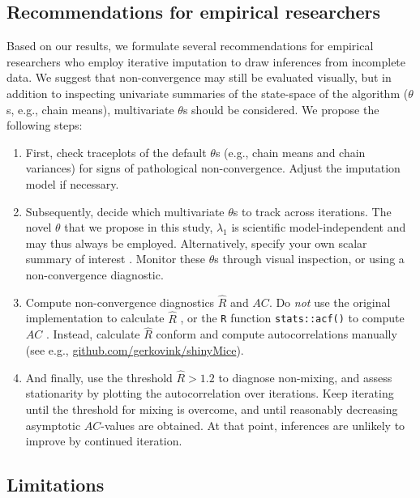 \documentclass[Royal,times,sageh]{sagej}
\begin{document}
\hypertarget{recommendations-for-empirical-researchers}{%
\subsection{Recommendations for empirical researchers}\label{recommendations-for-empirical-researchers}}

Based on our results, we formulate several recommendations for empirical researchers who employ iterative imputation to draw inferences from incomplete data. We suggest that non-convergence may still be evaluated visually, but in addition to inspecting univariate summaries of the state-space of the algorithm (\(\theta\)s, e.g., chain means), multivariate \(\theta\)s should be considered. We propose the following steps:

\begin{enumerate}
\def\labelenumi{\arabic{enumi}.}
\item
  First, check traceplots of the default \(\theta\)s (e.g., chain means and chain variances) for signs of pathological non-convergence. Adjust the imputation model if necessary.
\item
  Subsequently, decide which multivariate \(\theta\)s to track across iterations. The novel \(\theta\) that we propose in this study, \(\lambda_1\) is scientific model-independent and may thus always be employed. Alternatively, specify your own scalar summary of interest \citep[see e.g.,][]{buur18}. Monitor these \(\theta\)s through visual inspection, or using a non-convergence diagnostic.
\item
  Compute non-convergence diagnostics \(\widehat{R}\) and \(AC\). Do \emph{not} use the original implementation to calculate \(\widehat{R}\) \citep{gelm92}, or the \texttt{R} function \texttt{stats::acf()} to compute \(AC\) \citep{R}. Instead, calculate \(\widehat{R}\) conform \citet{veht19} and compute autocorrelations manually (see e.g., \href{https://github.com/gerkovink/shinyMice/tree/master/3.Thesis/}{github.com/gerkovink/shinyMice}).
\item
  And finally, use the threshold \(\widehat{R}>1.2\) to diagnose non-mixing, and assess stationarity by plotting the autocorrelation over iterations. Keep iterating until the threshold for mixing is overcome, and until reasonably decreasing asymptotic \(AC\)-values are obtained. At that point, inferences are unlikely to improve by continued iteration.
\end{enumerate}

\hypertarget{limitations}{%
\subsection{Limitations}\label{limitations}}
\end{document}
